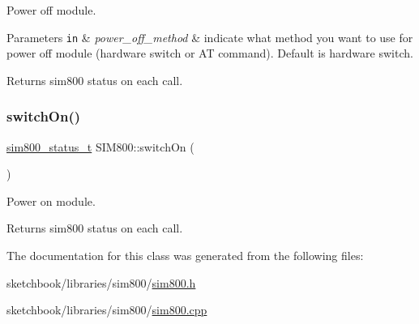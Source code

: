 Power off module. 


\begin{DoxyParams}[1]{Parameters}
\mbox{\tt in}  & {\em power\+\_\+off\+\_\+method} & indicate what method you want to use for power off module (hardware switch or AT command). Default is hardware switch. \\
\hline
\end{DoxyParams}
\begin{DoxyReturn}{Returns}
sim800 status on each call. 
\end{DoxyReturn}
\mbox{\label{classSIM800_a30eb06e923b419efac4866dd630ae849}} 
\subsubsection{\texorpdfstring{switch\+On()}{switchOn()}}
{\footnotesize\ttfamily \hyperlink{sim800_8h_a3d1eeaa095df003ea28385b81a134b27}{sim800\+\_\+status\+\_\+t} S\+I\+M800\+::switch\+On (\begin{DoxyParamCaption}{ }\end{DoxyParamCaption})}



Power on module. 

\begin{DoxyReturn}{Returns}
sim800 status on each call. 
\end{DoxyReturn}


The documentation for this class was generated from the following files\+:\begin{DoxyCompactItemize}
\item 
sketchbook/libraries/sim800/\hyperlink{sim800_8h}{sim800.\+h}\item 
sketchbook/libraries/sim800/\hyperlink{sim800_8cpp}{sim800.\+cpp}\end{DoxyCompactItemize}
